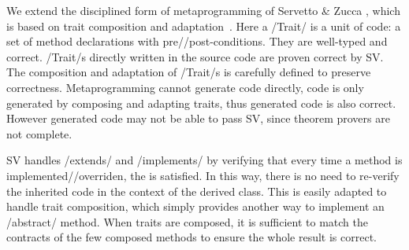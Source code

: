 We extend the disciplined form of metaprogramming of Servetto \& Zucca \cite{servetto2014meta}, which is based on trait composition and adaptation~\cite{scharli2003traits}.
Here a /Trait/ is a unit of code: a set of method declarations with pre//post-conditions.
They are well-typed and correct.
/Trait/s directly written in the source code
are proven correct by SV.
The composition and adaptation of /Trait/s is carefully defined to preserve correctness.
%
%
Metaprogramming cannot generate code directly, code is only generated by composing and adapting traits, thus generated code is also correct.
However generated code may not be able to pass SV, since theorem provers are not complete.

SV handles /extends/ and /implements/ by verifying that every 
time a method is implemented//overriden, 
the  is satisfied. In this way, there is no need to re-verify
the inherited code in the context of the derived class.
This is easily adapted
to handle trait composition, which simply provides another way to implement an /abstract/ method.
When traits are composed,
it is sufficient
to match the contracts of the few composed methods
to ensure the whole result is correct.

